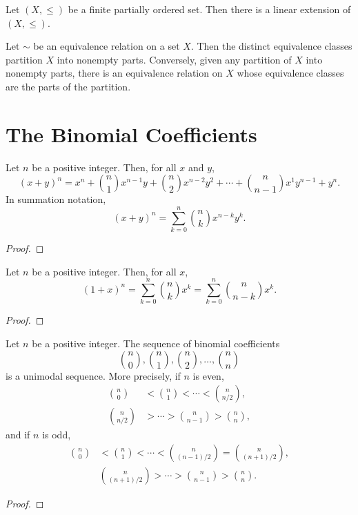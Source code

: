 \begin{theorem}
    \label{thm:4.5.2}
Let $(X, \leq)$ be a finite partially ordered set. Then there is a linear extension of $(X, \leq)$.
\end{theorem} 

\begin{theorem}
    \label{thm:4.5.3}
Let $\sim$ be an equivalence relation on a set $X$. Then the distinct equivalence classes partition $X$ into nonempty parts. Conversely, given any partition of $X$ into nonempty parts, there is an equivalence relation on $X$ whose equivalence classes are the parts of the partition.
\end{theorem} 

\chapter{The Binomial Coefficients}

\begin{theorem}
    \label{thm:5.2.1}
Let \( n \) be a positive integer. Then, for all \( x \) and \( y \),
\[
(x+y)^{n}=x^{n}+\binom{n}{1}x^{n-1}y+\binom{n}{2}x^{n-2}y^{2}+\cdots+\binom{n}{n-1}x^{1}y^{n-1}+y^{n}.
\]
In summation notation,
\[
(x+y)^n=\sum_{k=0}^n\binom{n}{k} x^{n-k} y^k.
\]
\end{theorem}
\begin{proof}
  \leanok
\end{proof}


\begin{theorem}
    \label{thm:5.2.2}
Let \( n \) be a positive integer. Then, for all \( x \),
\[
(1+x)^n = \sum_{k=0}^n \binom{n}{k} x^k = \sum_{k=0}^n \binom{n}{n-k} x^k.
\]
\end{theorem}
\begin{proof}
  \leanok
\end{proof}

\begin{theorem}
    \label{thm:5.3.1}
Let \( n \) be a positive integer. The sequence of binomial coefficients
\[
\binom{n}{0}, \binom{n}{1}, \binom{n}{2}, \ldots, \binom{n}{n}
\]
is a unimodal sequence. More precisely, if \( n \) is even,
\begin{align*}
\binom{n}{0} &< \binom{n}{1} < \cdots < \binom{n}{n/2}, \\
\binom{n}{n/2} &> \cdots > \binom{n}{n-1} > \binom{n}{n},
\end{align*}
and if \( n \) is odd,
\begin{align*}
\binom{n}{0} &< \binom{n}{1} < \cdots < \binom{n}{(n-1)/2} = \binom{n}{(n+1)/2}, \\
&\binom{n}{(n+1)/2} > \cdots > \binom{n}{n-1} > \binom{n}{n}.
\end{align*}
\end{theorem}
\begin{proof} 
  \leanok
\end{proof}

